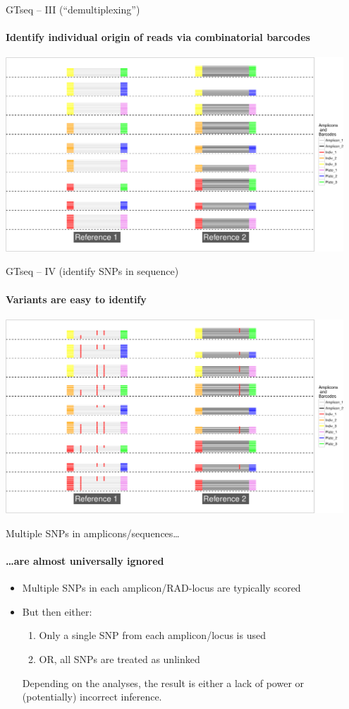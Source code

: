 \documentclass[letter,graphicx]{beamer}
\begin{document}
\begin{frame}{GTseq -- III (``demultiplexing'')}
\framesubtitle{Identify individual origin of reads via combinatorial barcodes}
\begin{center}
\includegraphics[width=0.95\textwidth]{figs/gtseq-demultiplexed-crop.pdf}
\end{center}
\end{frame}





\begin{frame}{GTseq -- IV (identify SNPs in sequence)}
\framesubtitle{Variants are easy to identify}
\begin{center}
\includegraphics[width=0.95\textwidth]{figs/gtseq-snps-crop.pdf}
\end{center}
\end{frame}




\begin{frame}{Multiple SNPs in amplicons/sequences\ldots}
\framesubtitle{\ldots are almost universally ignored }
\begin{itemize}
\item Multiple SNPs in each amplicon/RAD-locus are typically scored
\item But then either:
\begin{enumerate}
\item Only a single SNP from each amplicon/locus is used
\item OR, all SNPs are treated as unlinked
\end{enumerate}
Depending on the analyses, the result is either a lack of power or (potentially) incorrect inference.
\end{itemize}
\end{frame}
\end{document}
